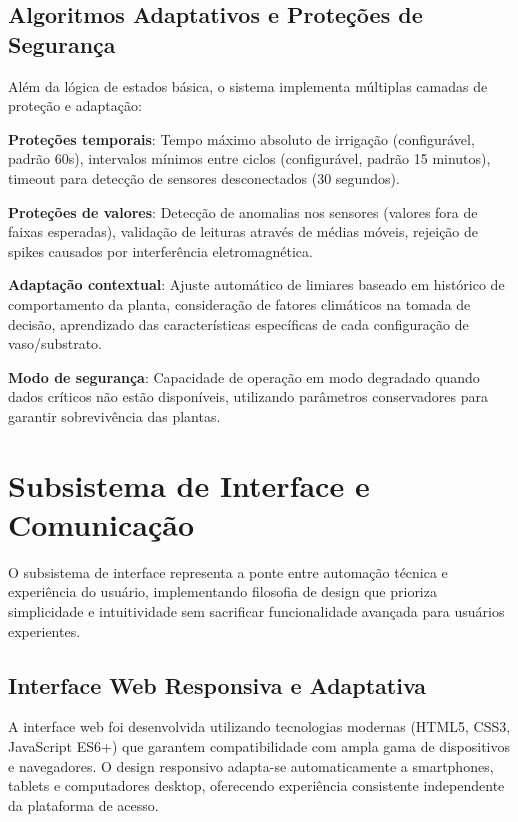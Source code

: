 \documentclass[twoside,english,brazilian]{UNISINOSmonografia}
\begin{document}
\subsection{Algoritmos Adaptativos e Proteções de Segurança}

Além da lógica de estados básica, o sistema implementa múltiplas camadas de proteção e adaptação:

\textbf{Proteções temporais}: Tempo máximo absoluto de irrigação (configurável, padrão 60s), intervalos mínimos entre ciclos (configurável, padrão 15 minutos), timeout para detecção de sensores desconectados (30 segundos).

\textbf{Proteções de valores}: Detecção de anomalias nos sensores (valores fora de faixas esperadas), validação de leituras através de médias móveis, rejeição de spikes causados por interferência eletromagnética.

\textbf{Adaptação contextual}: Ajuste automático de limiares baseado em histórico de comportamento da planta, consideração de fatores climáticos na tomada de decisão, aprendizado das características específicas de cada configuração de vaso/substrato.

\textbf{Modo de segurança}: Capacidade de operação em modo degradado quando dados críticos não estão disponíveis, utilizando parâmetros conservadores para garantir sobrevivência das plantas.

\section{Subsistema de Interface e Comunicação}

O subsistema de interface representa a ponte entre automação técnica e experiência do usuário, implementando filosofia de design que prioriza simplicidade e intuitividade sem sacrificar funcionalidade avançada para usuários experientes.

\subsection{Interface Web Responsiva e Adaptativa}

A interface web foi desenvolvida utilizando tecnologias modernas (HTML5, CSS3, JavaScript ES6+) que garantem compatibilidade com ampla gama de dispositivos e navegadores. O design responsivo adapta-se automaticamente a smartphones, tablets e computadores desktop, oferecendo experiência consistente independente da plataforma de acesso.
\end{document}
